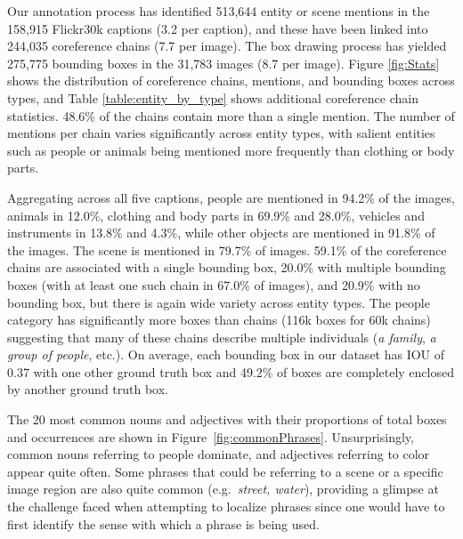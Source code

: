 \documentclass[twocolumn]{svjour3}
\begin{document}
Our annotation process has identified 513,644 entity or scene mentions in the 158,915 Flickr30k captions (3.2 per caption), and these have been linked into 244,035 coreference chains (7.7 per image). The box drawing process has yielded 275,775 bounding boxes in the 31,783 images (8.7 per image).
Figure \ref{fig:Stats} shows the distribution of coreference chains, mentions, and bounding boxes across types, and Table \ref{table:entity_by_type} shows additional coreference chain statistics.  48.6\% of the chains contain more than a single mention. The number of mentions per chain varies significantly across entity types, with salient entities such as people or animals being mentioned more frequently than clothing or body parts. 

Aggregating across all five captions, people are mentioned in 94.2\% of the images, animals in 12.0\%, clothing and body parts in 69.9\% and 28.0\%, vehicles and instruments in 13.8\% and 4.3\%, while other objects are mentioned in 91.8\% of the images. The scene is mentioned in 79.7\% of images. 59.1\% of the coreference chains are associated with a single bounding box, 20.0\% with multiple bounding boxes (with at least one such chain in 67.0\% of images), and 20.9\% with no bounding box, but there is again wide variety across entity types. The people category has significantly more boxes than chains (116k boxes for 60k chains) suggesting that many of these chains describe multiple individuals (\textit{a family}, \textit{a group of people}, etc.).  On average, each bounding box in our dataset has IOU of 0.37 with one other ground truth box and 49.2\% of boxes are completely enclosed by another ground truth box.

The 20 most common nouns and adjectives with their proportions of total boxes and occurrences are shown in Figure~\ref{fig:commonPhrases}.  Unsurprisingly, common nouns referring to people dominate, and adjectives referring to color appear quite often.  Some phrases that could be referring to a scene or a specific image region are also quite common (e.g.\ \emph{street, water}), providing a glimpse at the challenge faced when attempting to localize phrases since one would have to first identify the sense with which a phrase is being used.






\begin{figure*}
\centering
{}\vspace{-3mm}
\caption{Proportion of bounding boxes and occurrences across Flickr30k Entities of the most common {\bf (a)} nouns and {\bf (b)} adjectives.}
\label{fig:commonPhrases}
\end{figure*}
\end{document}
